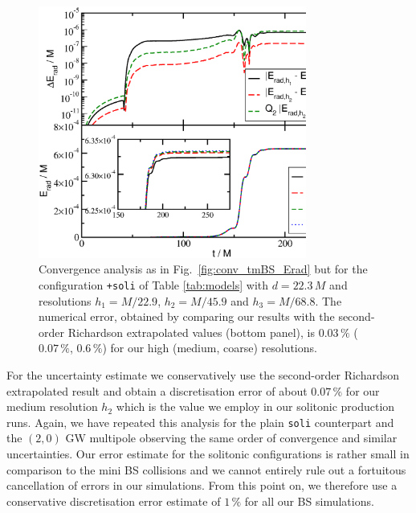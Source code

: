 \documentclass[]{iopart}
\begin{document}
\begin{figure}[t]
    \centering
    \includegraphics[width=250pt]{conv_tsBS_Erad.eps}
    \caption{Convergence analysis as in
    Fig.~\ref{fig:conv_tmBS_Erad} but for the configuration
    {\tt +soli} of Table \ref{tab:models} with
    $d=22.3\,M$ and
    resolutions $h_1=M/22.9$, $h_2=M/45.9$ and $h_3=M/68.8$.
    The numerical error,
    obtained by comparing our results
    with the second-order Richardson extrapolated values
    (bottom panel),
    is $0.03\,\%$ ($0.07\,\%$, $0.6\,\%$) for
    our high (medium, coarse) resolutions.
    }
    \label{fig:conv_tsBS_Erad}
\end{figure}
%
For the uncertainty estimate we conservatively use
the second-order Richardson extrapolated result and
obtain a discretisation error of about $0.07\,\%$ for
our medium resolution $h_2$ which is the value
we employ in our solitonic production runs. Again,
we have repeated this analysis for the plain
{\tt soli} counterpart and the $(2,0)$ GW multipole
observing the same order of convergence and similar uncertainties. Our error estimate for the solitonic
configurations is rather small in comparison to the
mini BS collisions and we cannot entirely rule out a
fortuitous cancellation of errors in our simulations.
From this point on, we therefore use a conservative
discretisation error estimate of $1\,\%$ for all
our BS simulations.
\end{document}
